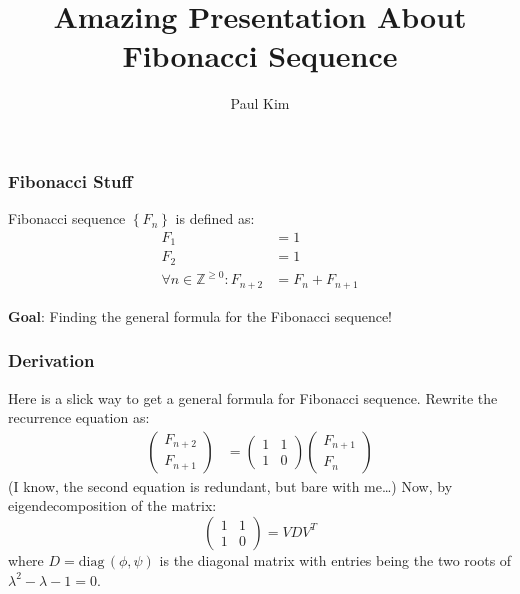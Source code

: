 \documentclass{beamer}
\title{Amazing Presentation About Fibonacci Sequence}
\author{Paul Kim}
\newcommand{\diag}[1]{\text{diag}\,#1}
\begin{document}
\frame{\titlepage}

\begin{frame}
    \frametitle{Fibonacci Stuff}
    \begin{definition}
        Fibonacci sequence $\left\{ F_n \right\}$ is defined as:
        \begin{align*}
            F_1 &= 1 \\
            F_2 &= 1 \\
            \forall n \in \mathbb{Z}^{\geq 0}: F_{n+2} &= F_{n} + F_{n+1}
        \end{align*}
    \end{definition}
    {
        \textbf{Goal}: Finding the general formula for the Fibonacci sequence!
    }
\end{frame}

\begin{frame}
    \frametitle{Derivation}
    Here is a slick way to get a general formula for Fibonacci sequence.
    {
        Rewrite the recurrence equation as:
        \begin{align*}
            \begin{pmatrix}
                F_{n+2} \\
                F_{n+1}
            \end{pmatrix}
            &= 
            \begin{pmatrix}
                1 & 1 \\
                1 & 0
            \end{pmatrix}
            \begin{pmatrix}
                F_{n+1} \\
                F_n
            \end{pmatrix}
        \end{align*}
        (I know, the second equation is redundant, but bare with me\dots)
    }
    Now, by eigendecomposition of the matrix:
    \begin{equation*}
        \begin{pmatrix}
            1 & 1 \\
            1 & 0
        \end{pmatrix}
        =
        V D V^T
    \end{equation*}
    where $D = \diag{\left( \phi, \psi \right)}$ is the diagonal matrix with entries being the two roots of
    $\lambda^2 - \lambda - 1 = 0$.
\end{frame}
\end{document}
